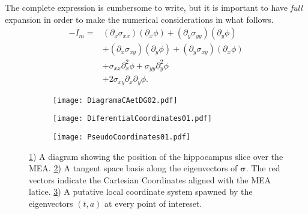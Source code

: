 \documentclass{article}
\newcommand{\cond}{\boldsymbol{\sigma}}
\begin{document}
The complete expression is cumbersome to write, but it is important to
have \emph{full} expansion in order to make the numerical considerations
in what follows.
\begin{equation}\label{Imcart}
  \begin{split}
  -I_m= & (\partial_x \sigma_{xx}) (\partial_x \phi) +
  (\partial_y \sigma_{yy}) (\partial_y \phi)\\
& +(\partial_x \sigma_{xy}) (\partial_y \phi) +(\partial_y \sigma_{xy}) (\partial_x \phi)\\
& + \sigma_{xx} \partial_x^2 \phi + \sigma_{yy} \partial_y^2 \phi\\
& + 2\sigma_{xy} \partial_x\partial_y \phi. 
\end{split}
 \end{equation}
  

\begin{figure}[h]
\centering
\begin{subfigure}[t]{0.20\textwidth}
\texttt{[image: DiagramaCAetDG02.pdf]}
\caption{}
\label{diagCA}
\end{subfigure}
\quad
\begin{subfigure}[t]{0.33\textwidth}
\texttt{[image: DiferentialCoordinates01.pdf]}
\caption{}
\label{loceig}
\end{subfigure}
\begin{subfigure}[t]{0.20\textwidth}
\texttt{[image: PseudoCoordinates01.pdf]}
\caption{}
\label{pseudocor}
\end{subfigure}
\caption{\ref{diagCA}) A diagram showing the position of
the hippocampus slice over the MEA. \ref{loceig}) 
A tangent space basis along the
eigenvectors of $\cond$. The red vectors indicate the
Cartesian Coordinates aligned with the MEA latice. 
\ref{pseudocor}) A putative local coordinate system spawned by the 
eigenvectors $(t,a)$ at every point of intereset. 
 }\label{diagdif}
\label{esquemas01}
\end{figure}
\end{document}

